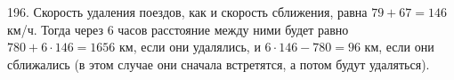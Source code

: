 196. Скорость удаления поездов, как и скорость сближения, равна $79+67=146$ км/ч. Тогда через 6 часов расстояние между ними будет равно $780+6\cdot146=1656$ км, если они удалялись, и $6\cdot146-780=96$ км, если они сближались (в этом случае они сначала встретятся, а потом будут удаляться).\\
